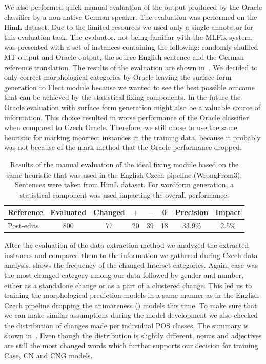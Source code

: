 We also performed quick manual evaluation of the output produced by the Oracle classifier by a non-native
German speaker.
The evaluation was performed on the HimL dataset.
Due to the limited
resources we used only a single annotator for this evaluation task. The evaluator, not being familiar
with the MLFix system, was presented with a set of instances containing the following: randomly shuffled MT output and Oracle output,
the source English sentence and the German reference translation. The results of the evaluation are shown in~.
We decided to only correct morphological categories by Oracle leaving the surface form generation to Flect module because
we wanted to see the best possible outcome that can be achieved by the statistical fixing components. In the future
the Oracle evaluation with  surface form generation might also be a valuable source of information.
This choice resulted in worse performance of the Oracle classifier when compared to Czech Oracle.
Therefore,
we still chose to use the same heuristic for marking incorrect instances in the training data, because
it probably was not because of the mark method that the Oracle performance dropped.

\begin{table}[t]
\centering
\small

\begin{tabular}{l|cc|ccc|cc}
Reference  &  Evaluated  &  Changed  &  $+$  &  $-$  &  0  &  Precision  &  Impact  \\
\hline
Post-edits  &  800  &  77  &  20  &  39  &  18  &  33.9\%  &  2.5\%  \\
\end{tabular}
\caption[Manual evaluation of the German Oracle classifier]{
Results of the manual evaluation of the ideal fixing module based on the same heuristic
that was used in the English-Czech pipeline (WrongFrom3). Sentences were taken from HimL dataset. For wordform generation, a statistical component
was used impacting the overall performance.
}
\label{oracle_de-maneval}
\end{table}

After the evaluation of the data extraction method we analyzed the extracted instances and compared them
to the information we gathered during Czech data analysis.  shows the frequency of the changed Interset
categories. Again, case was the most changed category among our data followed by gender and number, either as a standalone change or
as a part of a clustered change. This led us to training the morphological prediction models in a same manner as in the English-Czech
pipeline dropping the animateness () models this time. To make sure that we can make similar assumptions during
the model development we also checked the distribution of changes made per individual POS classes. The summary is shown in~.
Even though the distribution is slightly different, nouns and adjectives are still the most changed words which further supports
our decision for training Case, CN and CNG models.

